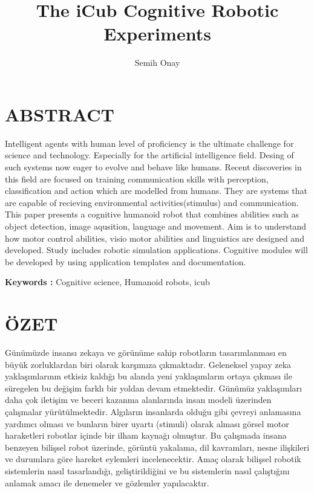 \documentclass[a4paper, 12pt]{report}
\title{The iCub Cognitive Robotic Experiments}
\author{Semih Onay}
\begin{document}
\makecstitle
\tableofcontents

\begin{symabbreviations}
\end{symabbreviations}
\chapter{ABSTRACT}
Intelligent agents with human level of proficiency is the ultimate challenge 
for science and technology. Especially for the artificial intelligence field. 
Desing of such systems now eager to evolve and behave like humans. 
Recent discoveries in this field are focused on training  communication 
skills with perception, classification and action which are modelled from 
humans. They are systems that are capable of recieving environmental 
activities(stimulus) and communication. This paper presents a cognitive 
humanoid robot that combines abilities such as object detection, image 
aqusition, language and movement. Aim is to understand how motor control 
abilities, visio motor abilities and linguistics are designed and developed. 
Study includes robotic simulation applications. Cognitive modules will be 
developed by using application templates and documentation.
\linebreak[2]

\textbf{Keywords :} Cognitive science, Humanoid robots, icub

\chapter{ÖZET}

Günümüzde insansı zekaya ve görünüme sahip robotların tasarımlanması en büyük 
zorluklardan biri olarak karşımıza çıkmaktadır. Geleneksel yapay zeka 
yaklaşımlarının etkisiz kaldığı bu alanda yeni yaklaşımların ortaya çıkması ile 
süregelen bu değişim farklı bir yoldan devam etmektedir. Günümüz yaklaşımları 
daha çok iletişim ve beceri kazanma alanlarında insan modeli üzerinden 
çalışmalar yürütülmektedir. Algıların insanlarda olduğu gibi çevreyi anlamasına 
yardımcı olması ve bunların birer uyartı (stimuli) olarak alması görsel motor 
haraketleri robotlar içinde bir ilham kaynağı olmuştur. Bu çalışmada insana 
benzeyen bilişsel robot üzerinde, görüntü yakalama, dil kavramları, nesne 
ilişkileri ve durumlara göre hareket eylemleri incelenecektir. Amaç olarak 
bilişsel robotik sistemlerin nasıl tasarlandığı, geliştirildiğini ve bu 
sistemlerin nasıl çalıştığını anlamak amacı ile denemeler ve gözlemler 
yapılacaktır.
\end{document}
